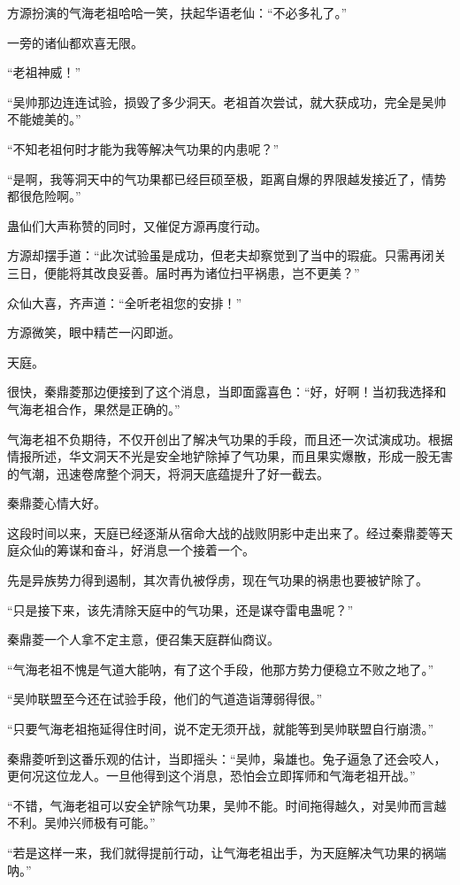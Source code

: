 \begin{this_body}
方源扮演的气海老祖哈哈一笑，扶起华语老仙：“不必多礼了。”

一旁的诸仙都欢喜无限。

“老祖神威！”

“吴帅那边连连试验，损毁了多少洞天。老祖首次尝试，就大获成功，完全是吴帅不能媲美的。”

“不知老祖何时才能为我等解决气功果的内患呢？”

“是啊，我等洞天中的气功果都已经巨硕至极，距离自爆的界限越发接近了，情势都很危险啊。”

蛊仙们大声称赞的同时，又催促方源再度行动。

方源却摆手道：“此次试验虽是成功，但老夫却察觉到了当中的瑕疵。只需再闭关三日，便能将其改良妥善。届时再为诸位扫平祸患，岂不更美？”

众仙大喜，齐声道：“全听老祖您的安排！”

方源微笑，眼中精芒一闪即逝。

天庭。

很快，秦鼎菱那边便接到了这个消息，当即面露喜色：“好，好啊！当初我选择和气海老祖合作，果然是正确的。”

气海老祖不负期待，不仅开创出了解决气功果的手段，而且还一次试演成功。根据情报所述，华文洞天不光是安全地铲除掉了气功果，而且果实爆散，形成一股无害的气潮，迅速卷席整个洞天，将洞天底蕴提升了好一截去。

秦鼎菱心情大好。

这段时间以来，天庭已经逐渐从宿命大战的战败阴影中走出来了。经过秦鼎菱等天庭众仙的筹谋和奋斗，好消息一个接着一个。

先是异族势力得到遏制，其次青仇被俘虏，现在气功果的祸患也要被铲除了。

“只是接下来，该先清除天庭中的气功果，还是谋夺雷电蛊呢？”

秦鼎菱一个人拿不定主意，便召集天庭群仙商议。

“气海老祖不愧是气道大能呐，有了这个手段，他那方势力便稳立不败之地了。”

“吴帅联盟至今还在试验手段，他们的气道造诣薄弱得很。”

“只要气海老祖拖延得住时间，说不定无须开战，就能等到吴帅联盟自行崩溃。”

秦鼎菱听到这番乐观的估计，当即摇头：“吴帅，枭雄也。兔子逼急了还会咬人，更何况这位龙人。一旦他得到这个消息，恐怕会立即挥师和气海老祖开战。”

“不错，气海老祖可以安全铲除气功果，吴帅不能。时间拖得越久，对吴帅而言越不利。吴帅兴师极有可能。”

“若是这样一来，我们就得提前行动，让气海老祖出手，为天庭解决气功果的祸端呐。”


\end{this_body}
